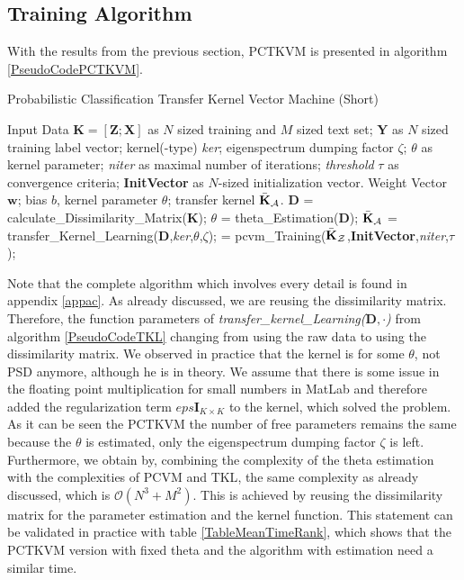 \subsection{Training Algorithm}\label{InSubSecTraining}
With the results from the previous section, \acs{PCTKVM} is presented in algorithm \ref{PseudoCodePCTKVM}.
\begin{algorithm}
	\caption{Probabilistic Classification Transfer Kernel Vector Machine (Short)}\label{PseudoCodePCTKVM}	
	\begin{algorithmic}[1]
		\Require Input Data $\mathbf{K} = [\mathbf{Z};\mathbf{X}]$ as $N$ sized training and $M$ sized text set; $\mathbf{Y}$ as $N$ sized training label vector; kernel(-type) \textit{ker}; eigenspectrum dumping factor $\zeta$; $\theta$ as kernel parameter; \textit{niter} as maximal number of iterations; \textit{threshold} $\tau$ as convergence criteria; \textbf{InitVector} as $N$-sized initialization vector.
		\Ensure Weight Vector $\mathbf{w}$; bias $b$, kernel parameter $\theta$; transfer kernel $\bar{\mathbf{K}}_\mathcal{A}$.
		\State $\mathbf{D}$ = calculate\_Dissimilarity\_Matrix($\mathbf{K}$);
		\State $\theta$ = theta\_Estimation($\mathbf{D}$);  
		\State $\bar{\mathbf{K}}_\mathcal{A}$ = transfer\_Kernel\_Learning($\mathbf{D}$,\textit{ker},$\theta$,$\zeta$); 
		\State [$\mathbf{w}$,$b$] = pcvm\_Training($\bar{\mathbf{K}}_\mathcal{Z}$,\textbf{InitVector},\textit{niter},$\tau$); 
	\end{algorithmic}
\end{algorithm}
Note that the complete algorithm which involves every detail is found in appendix \ref{appac}. As already discussed, we are reusing the dissimilarity matrix. Therefore, the function parameters of \textit{transfer\_kernel\_Learning($\mathbf{D},\cdot$)} from algorithm \ref{PseudoCodeTKL} changing from using the raw data to using the dissimilarity matrix.  
We observed in practice that the kernel is for some $\theta$, not \acs{PSD} anymore, although he is in theory.\cite{Long.2015}
We assume that there is some issue in the floating point multiplication for small numbers in MatLab and therefore added the regularization term $eps\mathbf{I}_{K\times K}$ to the kernel, which solved the problem.\\
As it can be seen the \acs{PCTKVM} the number of free parameters remains the same because the $\theta$ is estimated, only the eigenspectrum dumping factor $\zeta$ is left.
Furthermore, we obtain by, combining the complexity of the theta estimation with the complexities of \acs{PCVM} and \acs{TKL}, the same complexity as already discussed, which is $\mathcal{O}(N^3+M^2)$.
This is achieved by reusing the dissimilarity matrix for the parameter estimation and the kernel function.
This statement can be validated in practice with table \ref{TableMeanTimeRank}, which shows that the \acs{PCTKVM} version with fixed theta and the algorithm with estimation need a similar time.
